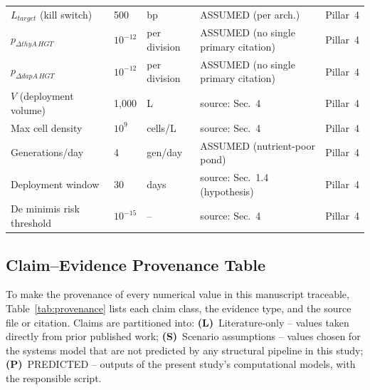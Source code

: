 \documentclass[10pt,twocolumn,letterpaper,
              colorlinks=true,
              linkcolor=blue!70!black,
              citecolor=blue!70!black,
              urlcolor=blue!70!black,
              pdfborder={0 0 0}]{article}
\begin{document}
\begin{table}[!t]
\begin{tabular}{@{}lllll@{}}
$L_{target}$ (kill switch)& 500                & bp                  & ASSUMED (per \cite{chan2016} arch.)           & Pillar~4 \\
$p_{\Delta thyA\,HGT}$    & $10^{-12}$         & per division        & ASSUMED (no single primary citation)         & Pillar~4 \\
$p_{\Delta dapA\,HGT}$    & $10^{-12}$         & per division        & ASSUMED (no single primary citation)         & Pillar~4 \\
$V$ (deployment volume)   & 1{,}000            & L                   & source: Sec.~4                               & Pillar~4 \\
Max cell density          & $10^9$             & cells/L             & source: Sec.~4                               & Pillar~4 \\
Generations/day           & 4                  & gen/day             & ASSUMED (nutrient-poor pond)                 & Pillar~4 \\
Deployment window         & 30                 & days                & source: Sec.~1.4 (hypothesis)               & Pillar~4 \\
De minimis risk threshold & $10^{-15}$         & --                 & source: Sec.~4                               & Pillar~4 \\
\bottomrule
\end{tabular}
\end{table}

\subsection{Claim--Evidence Provenance Table}

To make the provenance of every numerical value in this manuscript
traceable, Table~\ref{tab:provenance} lists each claim class, the
evidence type, and the source file or citation. Claims are partitioned
into: \textbf{(L)}~Literature-only -- values taken directly from prior
published work; \textbf{(S)}~Scenario assumptions -- values chosen for
the systems model that are not predicted by any structural pipeline in
this study; \textbf{(P)}~PREDICTED -- outputs of the present study's
computational models, with the responsible script.
\end{document}
